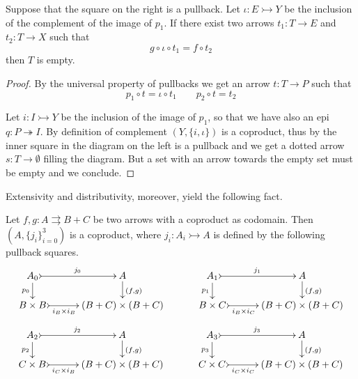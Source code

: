 \documentclass[a4paper,UKenglish,cleveref,pdftex,thm-restate,numberwithinsect]{lipics-v2021}
\def\X{\textbf {\textup{X}}}
\newcommand{\mto}{\rightarrowtail}
\newcommand{\eto}{\twoheadrightarrow}
\begin{document}
\noindent 
\parbox{11.5cm}{\begin{proposition}\label{prop:isempty}
	Suppose that the square on the right is a pullback. Let $\iota \colon E\mto Y$ be the inclusion of the complement of the image of $p_1$. If there exist two  arrows $t_1\colon T\to E$ and $t_2\colon T\to X$ such that \[g\circ \iota\circ t_1= f\circ t_2\] then $T$ is empty.
\end{proposition}}\hfill \parbox{2cm}{\vspace{-1.5cm}}
\begin{proof}
	By the universal property of pullbacks we get an arrow $t\colon T\to P$ such that 
	\[p_1\circ t=\iota \circ t_1 \qquad p_2\circ t=t_2\]
	\parbox{2cm}{}\hfill \parbox{10.5cm}{Let $i\colon I\mto Y$ be the inclusion of the image of $p_1$, so that we have also an epi $q\colon P\eto I$. By definition of complement $(Y, \{i, \iota\})$ is a coproduct, thus by   the inner square in the diagram on the left is a pullback and we get a dotted arrow $s\colon T\to \emptyset$ filling the diagram. But a set with an arrow towards the empty set must be empty and we conclude. \qedhere }
\end{proof}


Extensivity and distributivity, moreover, yield the following fact.

\begin{lemma}\label{lem:nodim}
	Let $f,g\colon A\rightrightarrows B+C$ be two arrows with a coproduct as codomain. Then $(A, \{j_i\}_{i=0}^
	3)$ is a coproduct, where $j_i\colon A_i\mto A $ is defined by the following pullback squares.
	\[\xymatrix@C=30pt@R=15pt{A_0 \ar@{>->}[r]^{j_0}  \ar[d]_{p_0}& A   \ar[d]^{(f,g)}& A_1 \ar@{>->}[r]^{j_1}  \ar[d]_{p_1} & A \ar[d]^{(f,g)} \\
		B\times B \ar@{>->}[r]_-{i_B\times i_B} & (B+C)\times (B+C) & B\times C \ar@{>->}[r]_-{i_B\times i_C} & (B+C)\times (B+C)}\]
	\[ \xymatrix@C=30pt@R=15pt{A_2 \ar@{>->}[r]^{j_2}  \ar[d]_{p_2}& A   \ar[d]^{(f,g)}& A_3 \ar@{>->}[r]^{j_3}  \ar[d]_{p_3} & A \ar[d]^{(f,g)} \\
		C\times B \ar@{>->}[r]_-{i_C\times i_B} & (B+C)\times (B+C) & C\times C \ar@{>->}[r]_-{i_C\times i_C} & (B+C)\times (B+C)}\]
\end{lemma}
\end{document}
